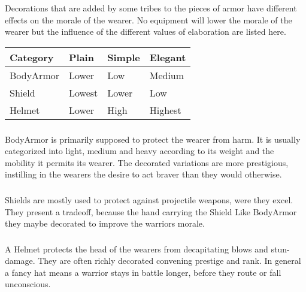 Decorations that are added by some tribes to the pieces of armor have different
effects on the morale of the wearer. No equipment will lower the morale of the
wearer but the influence of the different values of elaboration are listed
here.

\begin{longtable}{llll}
	\toprule
	Category        & Plain  & Simple & Elegant \\
	\midrule
	\Gls{BodyArmor} & Lower  & Low    & Medium  \\
	\Gls{Shield}    & Lowest & Lower  & Low     \\
	\Gls{Helmet}    & Lower  & High   & Highest \\
	\bottomrule
\end{longtable}

\subsubsection{}\label{ch:Goods:Armory:Armor:BodyArmor}

\Gls*{BodyArmor} is primarily supposed to protect the wearer from harm. It is usually
categorized into light, medium and heavy according to its weight and the
mobility it permits its wearer. The decorated variations are more prestigious,
instilling in the wearers the desire to act braver than they would otherwise.

\subsubsection{}\label{ch:Goods:Armory:Armor:Shield}

\Glspl*{Shield} are mostly used to protect against projectile weapons, were they excel.
They present a tradeoff, because the hand carrying the \gls*{Shield}
Like \gls{BodyArmor} they maybe decorated to improve the warriors morale.

\subsubsection{}\label{ch:Goods:Armory:Armor:Helmet}

A \gls*{Helmet} protects the head of the wearers from decapitating blows and
stun-damage. They are often richly decorated convening prestige and rank. In
general a fancy hat means a warrior stays in battle longer, before they route
or fall unconscious.
